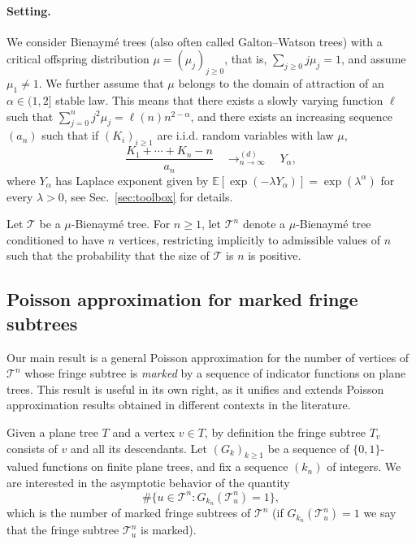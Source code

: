 \documentclass[a4paper,11pt]{article}
\DeclareRobustCommand{\1}{\mathbf{1}}
\newcommand\Es[1]{\mathbb{E}\left[#1\right]}
\begin{document}
\paragraph{Setting.} We consider Bienaym\'e trees (also often called Galton--Watson trees) with a critical offspring distribution $\mu=(\mu_j)_{j\ge0}$, that is, $\sum_{j\ge0}j\mu_j=1$, and assume $\mu_1\neq1$. We further assume that $\mu$ belongs to the domain of attraction of an $\alpha\in(1,2]$ stable law. This means that there exists a slowly varying function $\ell$ such that $ \sum_{j=0}^{n} j^{2} \mu_{j} =\ell(n) n ^{2-\alpha}$, and there exists an increasing sequence $(a_{n})$ such that if $(K_{i})_{i \geq 1}$ are i.i.d. random variables with law $\mu$,
\begin{equation}
\label{eq:an} \frac{K_{1}+ \cdots+K_{n}-n}{a_{n}}  \quad \mathop{\longrightarrow}^{(d)}_{n \rightarrow \infty} \quad Y_{\alpha},
\end{equation}
where $Y_{\alpha}$ has Laplace exponent given by $\Es{ \exp(- \lambda Y_{\alpha})}= \exp(\lambda ^ \alpha)$ for every $\lambda>0$, see Sec.~\ref{sec:toolbox} for details.


Let $\mathcal T$ be a $\mu$-Bienaym\'e tree. For $n\ge1$, let $\mathcal T^n$ denote a $\mu$-Bienaym\'e tree conditioned to have $n$ vertices, restricting implicitly to admissible values of $n$ such that the probability that the size of $ \mathcal{T}$ is $n$ is positive.

\subsection{Poisson approximation for marked fringe subtrees}

Our main result is a general Poisson approximation for the number of vertices of
$\mathcal T^n$ whose fringe subtree is \emph{marked} by a sequence of indicator functions on plane trees.
This result is useful in its own right, as it unifies and extends Poisson approximation results obtained in different contexts in the literature.

Given a plane tree $T$ and a vertex $v\in T$, by definition the fringe
subtree $T_v$ consists of $v$ and all its descendants. Let
$(G_k)_{k\ge1}$ be a sequence of $\{0,1\}$-valued functions on finite plane
trees, and fix a sequence $(k_n)$ of integers. We are interested in the asymptotic behavior of the quantity
$$
\#\{u\in\mathcal T^n : G_{k_n}(\mathcal T^n_u)=1\},
$$
which is the number of marked fringe subtrees of  $\mathcal T^n$ (if  $G_{k_n}(\mathcal T^n_u)=1$ we say that the fringe subtree  $\mathcal T^n_u$ is marked).
\end{document}
